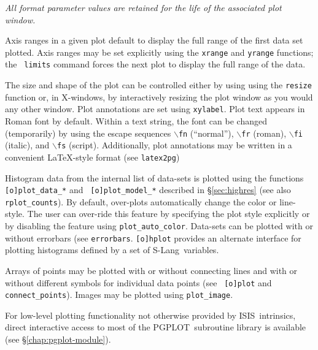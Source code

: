 \documentclass{book}
\newcommand{\isisx}{{\sc ISIS~}}
\newcommand{\pgplot}{{\sc PGPLOT}}
\newcommand{\slang}{{\sc S-Lang}}
\begin{document}
{{\it All format parameter values are retained for the life of
the associated plot window.}

Axis ranges in a given plot default to display the full range
of the first data set plotted. Axis ranges may be set explicitly
using the {\tt xrange} and {\tt yrange} functions; the {\tt
limits} command forces the next plot to display the full range of
the data.

The size and shape of the plot can be controlled either by using using
the {\tt resize} function or, in X-windows, by interactively resizing
the plot window as you would any other window. Plot annotations are
set using {\tt xylabel}.  Plot text appears in Roman font by default.
Within a text string, the font can be changed (temporarily) by using
the escape sequences $\backslash${\tt fn} (``normal''),
$\backslash${\tt fr} (roman), $\backslash${\tt fi} (italic), and
$\backslash${\tt fs} (script).  Additionally, plot annotations
may be written in a convenient \LaTeX-style format (see
\verb|latex2pg|)

Histogram data from the internal list of data-sets is plotted
using the functions {\tt [o]plot\_data\_*} and {\tt
[o]plot\_model\_*} described in \S\ref{sec:highres} (see also
\verb|rplot_counts|). By default, over-plots automatically change the
color or line-style. The user can over-ride this feature by
specifying the plot style explicitly or by disabling the feature
using {\tt plot\_auto\_color}. Data-sets can be plotted with or
without errorbars (see {\tt errorbars}.  {\tt [o]hplot} provides
an alternate interface for plotting histograms defined by a set of
\slang\ variables.

Arrays of points may be plotted with or without connecting lines and
with or without different symbols for individual data points (see {\tt
[o]plot} and {\tt connect\_points}).  Images may be plotted using
\verb|plot_image|.

For low-level plotting functionality not otherwise provided by
\isisx intrinsics, direct interactive access to most of the \pgplot\
subroutine library is available (see \S\ref{chap:pgplot-module}).

}
\end{document}
